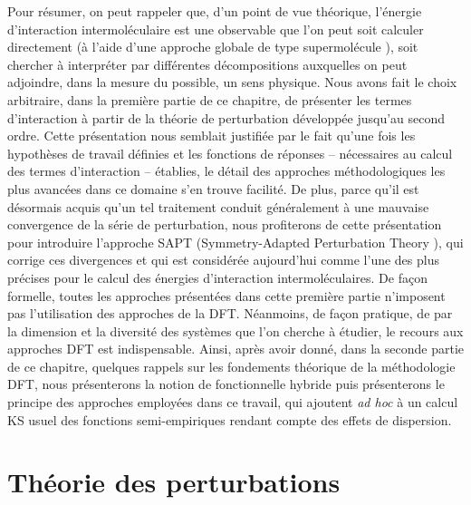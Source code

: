 	
	Pour résumer, on peut rappeler que, d’un point de vue théorique, l’énergie d’interaction intermoléculaire est une observable que l’on peut soit calculer directement (à l’aide d’une approche globale de type \og supermolécule \fg), soit chercher à interpréter par différentes décompositions auxquelles on peut adjoindre, dans la mesure du possible, un sens physique. Nous avons fait le choix arbitraire, dans la première partie de ce chapitre, de présenter les termes d’interaction à partir de la théorie de perturbation développée jusqu’au second ordre. Cette présentation nous semblait justifiée par le fait qu’une fois les hypothèses de travail définies et les fonctions de réponses -- nécessaires au calcul des termes d’interaction -- établies, le détail des approches méthodologiques les plus avancées dans ce domaine s’en trouve facilité. De plus, parce qu’il est désormais acquis qu’un tel traitement conduit généralement à une mauvaise convergence de la série de perturbation, nous profiterons de cette présentation pour introduire l’approche SAPT (\og Symmetry-Adapted Perturbation Theory \fg), qui corrige ces divergences et qui est considérée aujourd’hui comme l’une des plus précises pour le calcul des énergies d’interaction intermoléculaires. 
	De façon formelle, toutes les approches présentées dans cette première partie n’imposent pas l’utilisation des approches de la DFT. Néanmoins, de façon pratique, de par la dimension et la diversité des systèmes que l’on cherche à étudier, le recours aux approches DFT est indispensable. Ainsi, après avoir donné, dans la seconde partie de ce chapitre, quelques rappels sur les fondements théorique de la méthodologie DFT, nous présenterons la notion de fonctionnelle hybride puis présenterons le principe des approches employées dans ce travail, qui ajoutent \textit{ad hoc} à un calcul KS usuel des fonctions semi-empiriques rendant compte des effets de dispersion.\\
	
	
	
	
	
	
	
	
	
	
	
	
	\section[Théorie des perturbations]{Théorie des perturbations}
	
